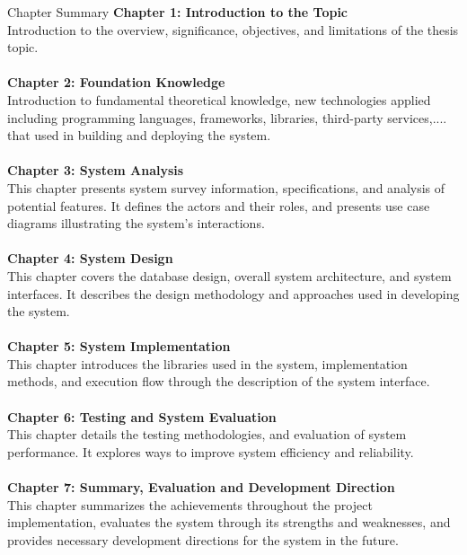 \begin{preface}{Chapter Summary}
  \textbf{Chapter 1: Introduction to the Topic}
  \\
  Introduction to the overview, significance, objectives, and limitations of the thesis topic.
  \\
  \\
  \textbf{Chapter 2: Foundation Knowledge}
  \\
  Introduction to fundamental theoretical knowledge, new technologies applied including programming languages, frameworks, libraries, third-party services,.... that used in building and deploying the system.
  \\
  \\
  \textbf{Chapter 3: System Analysis}
  \\
  This chapter presents system survey information, specifications, and analysis of potential features. It defines the actors and their roles, and presents use case diagrams illustrating the system's interactions.
  \\
  \\
  \textbf{Chapter 4: System Design}
  \\
  This chapter covers the database design, overall system architecture, and system interfaces. It describes the design methodology and approaches used in developing the system.
  \\
  \\
  \textbf{Chapter 5: System Implementation}
  \\
  This chapter introduces the libraries used in the system, implementation methods, and execution flow through the description of the system interface.
  \\
  \\
  \textbf{Chapter 6: Testing and System Evaluation}
  \\
  This chapter details the testing methodologies, and evaluation of system performance. It explores ways to improve system efficiency and reliability.
  \\
  \\
  \textbf{Chapter 7: Summary, Evaluation and Development Direction}
  \\
  This chapter summarizes the achievements throughout the project implementation, evaluates the system through its strengths and weaknesses, and provides necessary development directions for the system in the future.
  \end{preface}